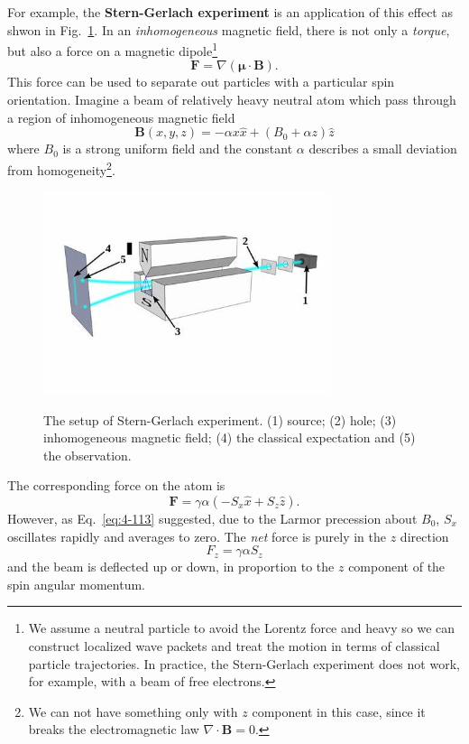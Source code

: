 For example, the \textbf{Stern-Gerlach experiment} is an application of this effect as shwon in Fig.~\ref{fig:4-4}.
In an \textit{inhomogeneous} magnetic field, there is not only a \textit{torque}, but also a force on a magnetic dipole\footnote{We assume a neutral particle to avoid the Lorentz force and heavy so we can construct localized wave packets and treat the motion in terms of classical particle trajectories. In practice, the Stern-Gerlach experiment does not work, for example, with a beam of free electrons.}
\begin{equation}
  \label{eq:4-117}
 \mathbf{F} = \nabla \left( \boldsymbol{\mu} \cdot \mathbf{B} \right) .
\end{equation}
This force can be used to separate out particles with a particular spin orientation.
Imagine a beam of relatively heavy neutral atom which pass through a region of inhomogeneous magnetic field
\begin{equation}
  \label{eq:4-118}
 \mathbf{B} \left( x,y,z \right) = -\alpha x \hat{x} + \left( B_0 + \alpha z \right) \hat{z}
\end{equation}
where $B_0$ is a strong uniform field and the constant $\alpha$ describes a small deviation from homogeneity\footnote{We can not have something only with $z$ component in this case, since it breaks the electromagnetic law $\nabla \cdot \mathbf{B} = 0$.}.

\begin{figure}[t]
  \centering
  \includegraphics[width=0.75\textwidth]{fig/fig4-3.png}
  \label{fig:4-4}
  \caption{The setup of Stern-Gerlach experiment. (1) source; (2) hole; (3) inhomogeneous magnetic field; (4) the classical expectation and (5) the observation.}
\end{figure}

The corresponding force on the atom is
\begin{equation*}
  \mathbf{F} = \gamma \alpha \left( -S_x \hat{x} + S_z \hat{z} \right) .
\end{equation*}
However, as Eq.~\eqref{eq:4-113} suggested, due to the Larmor precession about $B_0$, $S_x$ oscillates rapidly and averages to zero.
The \textit{net} force is purely in the $z$ direction
\begin{equation}
  \label{eq:4-119}
 F_z = \gamma \alpha S_z
\end{equation}
and the beam is deflected up or down, in proportion to the $z$ component of the spin angular momentum.

